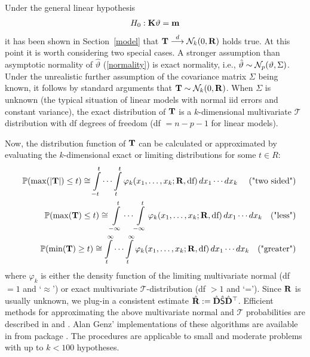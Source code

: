 \documentclass[12pt]{article}
\begin{document}
Under the general linear hypothesis \citep{Searle1971}
\begin{eqnarray*}
H_0: \mathbf{K} \vartheta = \mathbf{m}
\end{eqnarray*}
it has been shown in Section~\ref{model} that 
$\mathbf{T} \stackrel{d}{\longrightarrow} \mathcal{N}_k(0, \mathbf{R})$ holds true. At this point it is worth
considering two special cases. A stronger assumption than asymptotic normality
of $\hat{\vartheta}$ (\ref{normality}) is exact normality, i.e., 
$\hat{\vartheta} \sim \mathcal{N}_p(\vartheta, \Sigma)$. Under the unrealistic
further assumption of the covariance matrix $\Sigma$ being known, it
follows by standard arguments that $\mathbf{T} \sim \mathcal{N}_k(0, \mathbf{R})$. 
When $\Sigma$ is unknown (the typical situation of linear models
with normal iid errors and constant variance), the
exact distribution of $\mathbf{T}$ is a $k$-dimensional multivariate $\mathcal{T}$
distribution with df degrees of freedom (df $ = n - p - 1$ for linear models).

Now, the distribution function of $\mathbf{T}$ can be calculated or approximated
by evaluating the $k$-dimensional exact or limiting distributions for some $t \in R$:
\begin{eqnarray*}
& & \mathbb{P}(\max(|\mathbf{T}|) \le t)  \cong  \int\limits_{-t}^t \cdots \int\limits_{t}^t 
\varphi_k(x_1, \dots, x_k; \mathbf{R}, \text{df}) \, dx_1 \cdots dx_k \quad \text{ ("two sided")}\\
& & \mathbb{P}(\max(\mathbf{T}) \le t)  \cong\int\limits_{-\infty}^t \cdots \int\limits_{-\infty}^t 
\varphi_k(x_1, \dots, x_k; \mathbf{R}, \text{df}) \, dx_1 \cdots dx_k \quad \text{("less")}\\
& & \mathbb{P}(\min(\mathbf{T}) \ge t) \cong  \int\limits_{t}^\infty \cdots \int\limits_{t}^\infty \varphi_k(x_1, \dots, x_k; \mathbf{R}, \text{df}) \, dx_1 \cdots dx_k \quad \text{("greater")}\\
\end{eqnarray*}
where $\varphi_k$ is either the density function of the limiting multivariate
normal (df $ = 1$ and `$\approx$') or exact multivariate $\mathcal{T}$-distribution (df $ > 1$
and `='). 
Since $\mathbf{R}$ is usually unknown, we plug-in a consistent estimate
$\hat{\mathbf{R}} := \hat{\mathbf{D}} \hat{\textsf{S}} \hat{\mathbf{D}}^\top$. Efficient methods
for approximating the above multivariate normal and $\mathcal{T}$ 
probabilities are described in \cite{Genz1992,GenzBretz1999,BretzGenzHothorn2001}
and \cite{GenzBretz2002}. Alan Genz' implementations of these algorithms
are available in \RR{} from package  
\citep{pkg:mvtnorm,Rnews:Hothorn+Bretz+Genz:2001}. The procedures
are applicable to small and moderate problems with up to $k < 100$ hypotheses.
\end{document}
